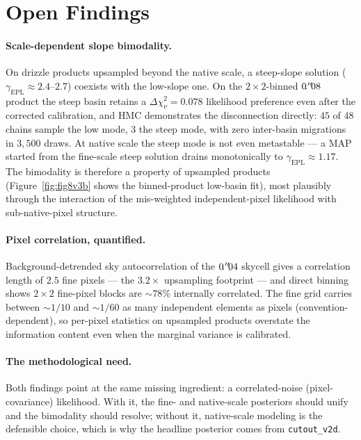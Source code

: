 \documentclass[11pt,letterpaper]{article}
\newcommand{\gammaEPL}{\ensuremath{\gamma_{\mathrm{EPL}}}}
\begin{document}
\section{Open Findings}
\label{sec:open}

\paragraph{Scale-dependent slope bimodality.} On drizzle products
upsampled beyond the native scale, a steep-slope solution
($\gammaEPL\approx2.4$--$2.7$) coexists with the low-slope one. On the
$2\times2$-binned $0\mbox{$\!\!\,.{}^{\prime\prime}\!\!\,$}08$ product the steep basin retains a
$\Delta\chi^{2}_{\nu}=0.078$ likelihood preference even after the
corrected calibration, and HMC demonstrates the disconnection
directly: $45$ of $48$ chains sample the low mode, $3$ the steep mode,
with zero inter-basin migrations in $3{,}500$ draws. At native scale
the steep mode is not even metastable --- a MAP started from the
fine-scale steep solution drains monotonically to
$\gammaEPL\approx1.17$. The bimodality is therefore a property of
upsampled products (Figure~\ref{fig:fig8v3b} shows the binned-product
low-basin fit), most plausibly through the interaction of the
mis-weighted independent-pixel likelihood with sub-native-pixel
structure.

\paragraph{Pixel correlation, quantified.} Background-detrended sky
autocorrelation of the $0\mbox{$\!\!\,.{}^{\prime\prime}\!\!\,$}04$ skycell gives a correlation length
of $2.5$ fine pixels --- the $3.2\times$ upsampling footprint --- and
direct binning shows $2\times2$ fine-pixel blocks are $\sim$$78\%$
internally correlated. The fine grid carries between $\sim$$1/10$ and
$\sim$$1/60$ as many independent elements as pixels
(convention-dependent), so per-pixel statistics on upsampled products
overstate the information content even when the marginal variance is
calibrated.

\paragraph{The methodological need.} Both findings point at the same
missing ingredient: a correlated-noise (pixel-covariance) likelihood.
With it, the fine- and native-scale posteriors should unify and the
bimodality should resolve; without it, native-scale modeling is the
defensible choice, which is why the headline posterior comes from
\texttt{cutout\_v2d}.
\end{document}
